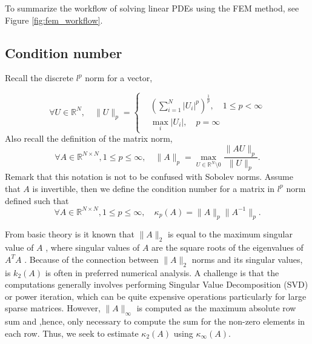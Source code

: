 \documentclass[11pt]{article}
\theoremstyle{remark}
\newcommand{\abs}[1]{\left\lvert #1 \right\rvert}
\renewcommand{\le}{\leqslant}
\numberwithin{equation}{section}
\begin{document}
To summarize the workflow of solving linear PDEs using the FEM method, see Figure \ref{fig:fem_workflow}.

\subsection{Condition number}%
\label{sub:note_on_condition_number}

Recall the discrete $l^{p}$ norm for a vector,

 \begin{equation}
     \forall U \in \mathbb{R} ^{N}, \quad
\| U  \|_{ p }^{  } =
     \begin{cases}
     &  \left( \sum_{i=1}^{N}  \abs{ U_{i}  }^{p} \right)^{\frac{1}{p}} , \quad  1\le p < \infty \\
   &  \max_{i}  \abs{ U_i },  \quad  p= \infty
     \end{cases}
 \end{equation}
Also recall the definition of the matrix norm,
\begin{equation}
 \forall A \in \mathbb{R} ^{N\times N}, 1\le p \le  \infty, \quad  \| A  \|_{p  }^{  }  = \max_{U \in \mathbb{R} ^{N} \setminus 0} \frac{\| AU \|_{ p }^{  } }{\| U \|_{p}^{  } }.
\end{equation}
Remark that this notation is not to be confused with Sobolev norms.
Assume that $A $ is invertible, then we define the condition number for a matrix in $l^{p}  $ norm defined such that
\begin{equation}
    \label{eq:condition_num}
 \forall A \in \mathbb{R} ^{N\times N}, 1\le p \le  \infty, \quad  \kappa_{p} ( A) = \| A  \|_{ p }^{  } \| A ^{-1} \|_{ p }.
\end{equation}

From basic theory is it known that $\| A \|_{ 2 }^{  } $   is equal to the maximum singular value of $A$ , where singular values of $ A$  are the square roots of the eigenvalues of $A^TA$ \cite[Theorem 2.9]{ suli2003introduction}. Because of the connection
between $\| A \|_{ 2 }^{  } $ norms and its singular values, is $k_{2}( A) $ is often in preferred numerical analysis.
A challenge is that the computations generally involves performing Singular Value Decomposition (SVD)
 or power iteration, which can be quite expensive operations particularly for large sparse matrices.
 However,  $\| A \|_{ \infty }^{  } $ is computed as the maximum absolute row sum and ,hence, only necessary to compute the sum for the non-zero elements in each row. Thus, we seek to estimate
 $\kappa_{2}( A) $ using $ \kappa _{\infty}( A) $.
\end{document}
